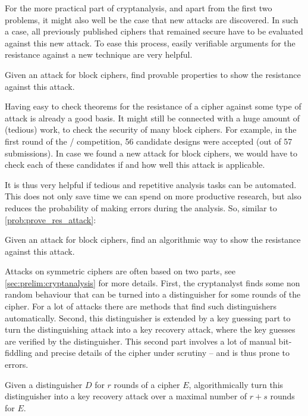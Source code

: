 For the more practical part of cryptanalysis, and apart from the first two problems, it might also well be the case that new attacks are discovered.
In such a case, all previously published ciphers that remained secure have to be evaluated against this new attack.
To ease this process, easily verifiable arguments for the resistance against a new technique are very helpful.

\begin{problem}\label{prob:prove_res_attack}
    Given an attack for block ciphers, find provable properties to show the resistance against this attack.
\end{problem}

Having easy to check theorems for the resistance of a cipher against some type of attack is already a good basis.
It might still be connected with a huge amount of (tedious) work, to check the security of many block ciphers.
For example, in the first round of the \LWC/ competition, 56 candidate designs were accepted (out of 57 submissions).
In case we found a new attack for block ciphers, we would have to check each of these candidates if and how well this attack is applicable.

It is thus very helpful if tedious and repetitive analysis tasks can be automated.
This does not only save time we can spend on more productive research, but also reduces the probability of making errors during the analysis.
So, similar to \cref{prob:prove_res_attack}:
\begin{problem}\label{prob:alg_res_attack}
    Given an attack for block ciphers, find an algorithmic way to show the resistance against this attack.
\end{problem}

Attacks on symmetric ciphers are often based on two parts, see \cref{sec:prelim:cryptanalysis} for more details.
First, the cryptanalyst finds some non random behaviour that can be turned into a distinguisher for some rounds of the cipher.
For a lot of attacks there are methods that find such distinguishers automatically.
Second, this distinguisher is extended by a key guessing part to turn the distinguishing attack into a key recovery attack, where the key guesses are verified by the distinguisher.
This second part involves a lot of manual bit-fiddling and precise details of the cipher under scrutiny -- and is thus prone to errors.
\begin{problem}\label{prob:key_rec}
    Given a distinguisher $D$ for $r$ rounds of a cipher $E$, algorithmically turn this distinguisher into a key recovery attack over a maximal number of $r+s$ rounds for $E$.
\end{problem}

